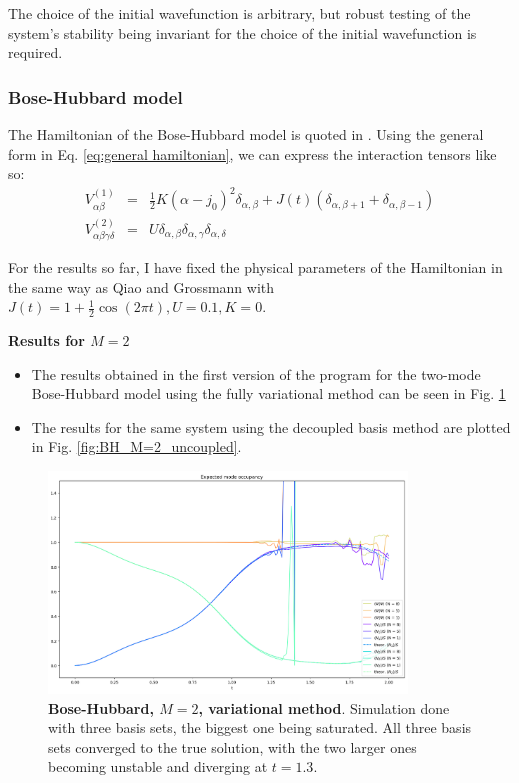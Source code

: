 \documentclass[12pt]{article}
\begin{document}
	 The choice of the initial wavefunction is arbitrary, but robust testing of the system's stability being invariant for the choice of the initial wavefunction is required.
	
	\subsubsection{Bose-Hubbard model}
	The Hamiltonian of the Bose-Hubbard model is quoted in \cite[Eq. 1]{grossmann}. Using the general form in Eq. \ref{eq:general hamiltonian}, we can express the interaction tensors like so:
	\begin{eqnarray}
	V^{(1)}_{\alpha\beta}&=&\frac{1}{2}K(\alpha-j_0)^2\delta_{\alpha,\beta}+J(t)(\delta_{\alpha,\beta +1}+\delta_{\alpha,\beta -1})\\
	V^{(2)}_{\alpha\beta\gamma\delta}&=&U\delta_{\alpha,\beta}\delta_{\alpha,\gamma}\delta_{\alpha,\delta}
	\end{eqnarray}
	
	For the results so far, I have fixed the physical parameters of the Hamiltonian in the same way as Qiao and Grossmann with $J(t)=1+\frac{1}{2}\cos(2\pi t), U=0.1, K=0$.
	
	\textbf{Results for $M=2$}
	\begin{itemize}
	\item The results obtained in the first version of the program for the two-mode Bose-Hubbard model using the fully variational method can be seen in Fig. \ref{fig:BH_M=2_variational}
	\item The results for the same system using the decoupled basis method are plotted in Fig. \ref{fig:BH_M=2_uncoupled}.
	\end{itemize}
	
	\begin{figure}
	\begin{center}
	\vspace{-2cm}
	\includegraphics[width=0.85\textwidth]{images/BH_M=2}
	\caption{\textbf{Bose-Hubbard, $M=2$, variational method}. Simulation done with three basis sets, the biggest one being saturated. All three basis sets converged to the true solution, with the two larger ones becoming unstable and diverging at $t=1.3$.}\label{fig:BH_M=2_variational}
	\end{center}
	\end{figure}
	
\end{document}
